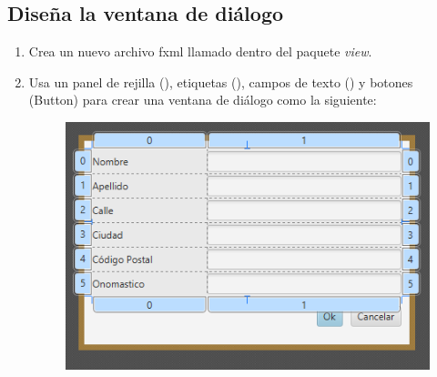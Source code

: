\subsection{Diseña la ventana de diálogo}
\begin{enumerate}
    \item Crea un nuevo archivo fxml llamado  dentro del paquete \textit{view}.
    \item Usa un panel de rejilla (), etiquetas (), campos de texto 
    () y botones (Button) para crear una ventana de diálogo como la siguiente:
    \begin{figure}[H]
		\includegraphics{img/5-VentanaDialogo.png}
	\end{figure}
\end{enumerate}

